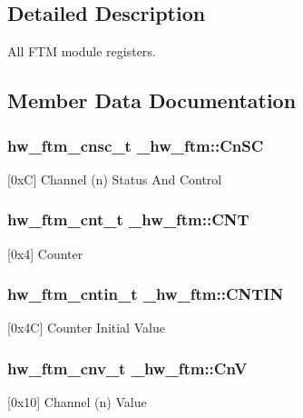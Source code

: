 \subsection{Detailed Description}
All F\+TM module registers. 

\subsection{Member Data Documentation}
\subsubsection[{\texorpdfstring{Cn\+SC}{CnSC}}]{ {\bf hw\+\_\+ftm\+\_\+cnsc\+\_\+t} \+\_\+hw\+\_\+ftm\+::\+Cn\+SC}\hypertarget{struct__hw__ftm_a13efffcf9fcf563fe12333cc09e14100}{}\label{struct__hw__ftm_a13efffcf9fcf563fe12333cc09e14100}
\mbox{[}0xC\mbox{]} Channel (n) Status And Control 
\subsubsection[{\texorpdfstring{C\+NT}{CNT}}]{ {\bf hw\+\_\+ftm\+\_\+cnt\+\_\+t} \+\_\+hw\+\_\+ftm\+::\+C\+NT}\hypertarget{struct__hw__ftm_a3869a58f40d4aece53973dab2e9932f7}{}\label{struct__hw__ftm_a3869a58f40d4aece53973dab2e9932f7}
\mbox{[}0x4\mbox{]} Counter 
\subsubsection[{\texorpdfstring{C\+N\+T\+IN}{CNTIN}}]{ {\bf hw\+\_\+ftm\+\_\+cntin\+\_\+t} \+\_\+hw\+\_\+ftm\+::\+C\+N\+T\+IN}\hypertarget{struct__hw__ftm_ae7f5d5e1e5e1d2a3ed56b30332bb38e5}{}\label{struct__hw__ftm_ae7f5d5e1e5e1d2a3ed56b30332bb38e5}
\mbox{[}0x4C\mbox{]} Counter Initial Value 
\subsubsection[{\texorpdfstring{CnV}{CnV}}]{ {\bf hw\+\_\+ftm\+\_\+cnv\+\_\+t} \+\_\+hw\+\_\+ftm\+::\+CnV}\hypertarget{struct__hw__ftm_a20ce8f525843d17d1a7295e927e1f272}{}\label{struct__hw__ftm_a20ce8f525843d17d1a7295e927e1f272}
\mbox{[}0x10\mbox{]} Channel (n) Value 
